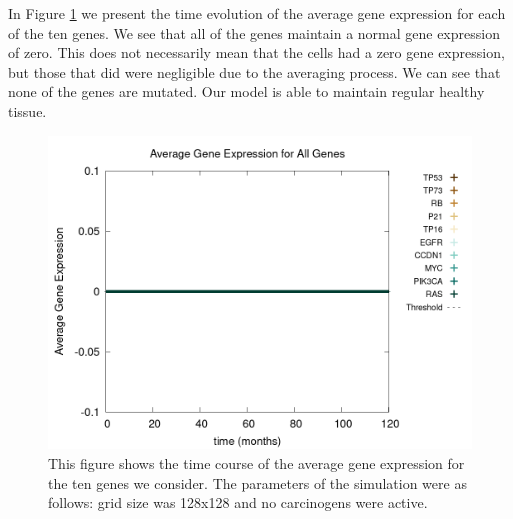 \documentclass[\main/thesis.tex]{subfiles}
\begin{document}
In Figure \ref{fig:EquilibriumGeneExprAll} we present the time evolution of the average gene expression for each of the ten genes. We see that all of the genes maintain a normal gene expression of zero. This does not necessarily mean that the cells had a zero gene expression, but those that did were negligible due to the averaging process. We can see that none of the genes are mutated. Our model is able to maintain regular healthy tissue. 
\begin{figure}[H]
    \centering
    \includegraphics[width=\textwidth]{images/1_Equilibrium/Fig3/geneExprAll_all.png}
    \caption{This figure shows the time course of the average gene expression for the ten genes we consider. The parameters of the simulation were as follows: grid size was 128x128 and no carcinogens were active.}
    \label{fig:EquilibriumGeneExprAll}
\end{figure}
\end{document}
